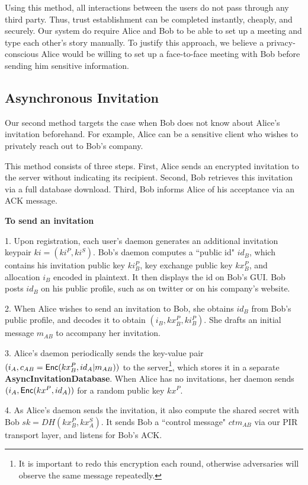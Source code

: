 Using this method, all interactions between the users do not pass through any third party. Thus, trust establishment can be completed instantly, cheaply, and securely. Our system do require Alice and Bob to be able to set up a meeting and type each other's story manually. To justify this approach, we believe a privacy-conscious Alice would be willing to set up a face-to-face meeting with Bob before sending him sensitive information.

\subsection{Asynchronous Invitation}


Our second method targets the case when Bob does not know about Alice's invitation beforehand. For example, Alice can be a sensitive client who wishes to privately reach out to Bob's company. 

This method consists of three steps. First, Alice sends an encrypted invitation to the server without indicating its recipient. Second, Bob retrieves this invitation via a full database download. Third, Bob informs Alice of his acceptance via an ACK message.

\textbf{To send an invitation}

1. Upon registration, each user's daemon generates an additional invitation keypair $ki = (ki^P, ki^S)$. Bob's daemon computes a ``public id" $id_B$, which contains his invitation public key $ki_B^P$, key exchange public key $kx_B^P$, and allocation $i_B$ encoded in plaintext. It then displays the id on Bob's GUI. Bob posts $id_B$ on his public profile, such as on twitter or on his company's website.

2. When Alice wishes to send an invitation to Bob, she obtains $id_B$ from Bob's public profile, and decodes it to obtain $(i_B, kx_B^P, ki_B^P)$. She drafts an initial message $m_{AB}$ to accompany her invitation. 

3. Alice's daemon periodically sends the key-value pair $(i_A, c_{AB} = \mathsf{Enc}(kx_B^P, id_A \vert m_{AB}))$ to the server\footnote{It is important to redo this encryption each round, otherwise adversaries will observe the same message repeatedly.}, which stores it in a separate \textbf{AsyncInvitationDatabase}. When Alice has no invitations, her daemon sends $(i_A, \mathsf{Enc}(kx^P, id_A))$ for a random public key $kx^P$.

4. As Alice's daemon sends the invitation, it also compute the shared secret with Bob $sk = DH(kx_B^P, kx^S_A)$. It sends Bob a ``control message" $ctm_{AB}$ via our PIR transport layer, and listens for Bob's ACK.


